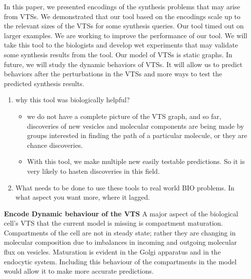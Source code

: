 \noindent In this paper, we presented encodings of the synthesis problems
that may arise from VTSs.
%
We demonstrated that our tool based on the encodings
scale up to the relevant sizes of the VTSs for some synthesis queries.
%
Our tool timed out on larger examples.
%
We are working to improve the performance of our tool.
%
We will take this tool to the biologists and develop wet experiments that may validate some synthesis results from the tool.
%
Our model of VTSs is static graphs.
%
In future, we will study the dynamic behaviors of VTSs.
%
It will allow us to predict behaviors after the perturbations in the VTSs
and more ways to test the predicted synthesis results.\\

\begin{enumerate}
  \item why this tool was biologically helpful?
        \begin{itemize}
        	\item we do not have a complete picture of the VTS graph, and so far, discoveries of new vesicles and molecular components are being made by groups interested in finding the path of a particular molecule, or they are chance discoveries. 
        	\item With this tool, we make multiple new easily testable predictions. So it is very likely to hasten discoveries in this field.
        \end{itemize}
  \item What  needs  to  be  done  to  use  these  tools  to  real  world  BIO problems. In what aspect you want more, where it lagged.
\end{enumerate}


\textbf{Encode Dynamic behaviour of the VTS} A major aspect of the biological cell’s VTS that the current model is missing is compartment maturation. Compartments of the cell are not in steady state; rather they are changing in molecular composition due to imbalances in incoming and outgoing molecular flux on vesicles.
Maturation  is  evident  in  the  Golgi  apparatus  and  in  the  endocytic system. 
Including this behaviour of the compartments in the model would allow it to make more accurate predictions.
